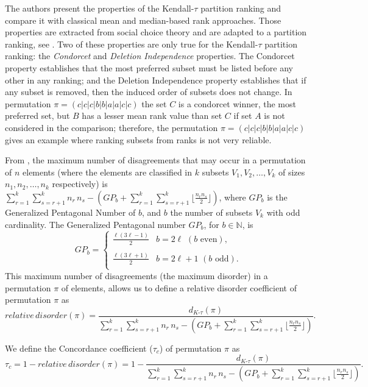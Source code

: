 The authors \cite{Aparicio2020} present the properties of the Kendall-$\tau$ partition ranking and compare it with classical mean and median-based rank approaches. Those properties are extracted from social choice theory and are adapted to a partition ranking, see \cite{arrow1951,Kemeny1959,zahid2015}. Two of these properties are only true for the Kendall-$\tau$ partition ranking: the \emph{Condorcet} and \emph{Deletion Independence} properties. The Condorcet property establishes that the most preferred subset must be listed before any other in any ranking; and the Deletion Independence property establishes that if any subset is removed, then the induced order of subsets does not change. In permutation $\pi=(c|c|c|b|b|a|a|c|c)$ the set $C$ is a condorcet winner, the most preferred set, but $B$ has a lesser mean rank value than set $C$ if set $A$ is not considered in the comparison; therefore, the permutation $\pi=(c|c|c|b|b|a|a|c|c)$ gives an example where ranking subsets from ranks is not very reliable. 

From \cite{Aparicio2020}, the maximum number of disagreements that may occur in a permutation of $n$ elements (where the elements are classified in $k$ subsets $V_1, V_2,\ldots, V_k$ of sizes $n_1, n_2,\ldots, n_k$ respectively) is $\sum_{r=1}^k\sum_{s =r+1}^k n_r \, n_s - (GP_{b} +\sum_{r=1}^k\sum_{s =r+1}^k \displaystyle\lfloor\frac{n_r n_s}{2}\displaystyle\rfloor )$, where $GP_{b}$ is the Generalized Pentagonal Number of $b$, and $b$ the number of subsets $V_k$ with odd cardinality.   The Generalized Pentagonal number $GP_{b}$, for $b\in \mathbb{N}$, is 
$$GP_b=\left\{ \begin{array}{ll}\displaystyle\frac{\ell(3\ell -1)}{2} & b=2\ell \,\, (b \,\, \text{even}),\\  & \\\displaystyle\frac{\ell(3\ell +1)}{2} & b=2\ell +1 \,\, (b \,\, \text{odd}).\\ \end{array} \right. $$
This maximum number of  disagreements (the maximum disorder) in a permutation $\pi$ of elements, allows us to define a relative disorder coefficient of permutation $\pi$ as
$$ relative\,  disorder(\pi) = \frac{\displaystyle d_{K\text{-}\tau}(\pi)}{\displaystyle\sum_{r=1}^k\sum_{s =r+1}^k  n_r \, n_s   -  (GP_{b} +\sum_{r=1}^k\sum_{s =r+1}^k\displaystyle\lfloor\frac{n_r n_s}{2}\displaystyle\rfloor )}.$$

\begin{definition}
	We define the  Concordance coefficient ($\tau_c$) of permutation $\pi$ as
	$$\tau_c= 1- relative\, disorder(\pi) = 1- \frac{\displaystyle d_{K\text{-}\tau}(\pi)}{\displaystyle\sum_{r=1}^k\sum_{s =r+1}^k  n_r \, n_s   -  (GP_{b} +\sum_{r=1}^k\sum_{s =r+1}^k\displaystyle\lfloor\frac{n_r n_s}{2}\displaystyle\rfloor )} .$$
\end{definition}

